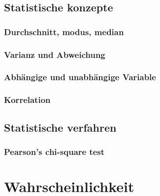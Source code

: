 \documentclass[letterpaper, titlepage]{article}
\begin{document}
\subsection{Statistische konzepte}\label{Statistische konzepte}

\subsubsection{Durchschnitt, modus, median}\label{Durchschnitt, modus, median}

\subsubsection{Varianz und Abweichung}\label{Varianz und Abweichung}

\subsubsection{Abhängige und unabhängige Variable}\label{Abhängige und unabhängige Variable}

\subsubsection{Korrelation}\label{Korrelation}

\subsection{Statistische verfahren}\label{Statistische verfahren}

\subsubsection{Pearson's chi-square test}\label{Pearson's chi-square test}


\section{Wahrscheinlichkeit}\label{Wahrscheinlichkeit}
\end{document}
